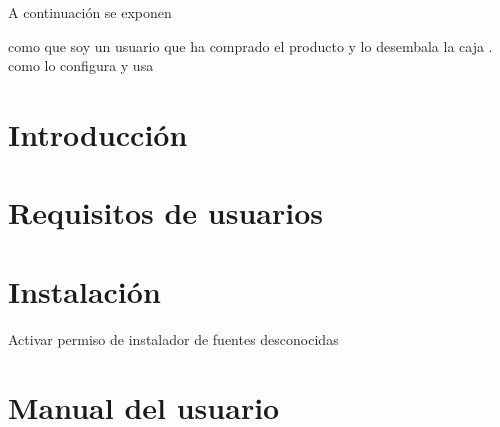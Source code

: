 A continuación se exponen 

como que soy un usuario que ha comprado el producto y lo desembala la caja . como lo configura y usa




\section{Introducción}
\section{Requisitos de usuarios}
\section{Instalación}
Activar permiso de instalador de fuentes desconocidas
\section{Manual del usuario}

